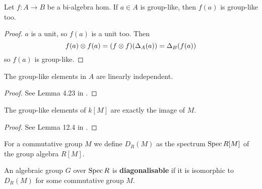 \begin{lemma}
  \label{0-grp-like-map}
  \leanok

  Let $f : A \to B$ be a bi-algebra hom. If $a \in A$ is group-like, then $f(a)$ is group-like too.
\end{lemma}
\begin{proof}
  \uses{}
  \leanok

  $a$ is a unit, so $f(a)$ is a unit too. Then
  \[
    f(a) \otimes f(a) = (f \otimes f)(\Delta_A(a)) = \Delta_B(f(a))
  \]
  so $f(a)$ is group-like.
\end{proof}


\begin{lemma}
  \label{0-grp-like-lin-indep}
  \leanok

  The group-like elements in $A$ are linearly independent.
\end{lemma}
\begin{proof}
  \leanok

  See Lemma 4.23 in \cite{Milne_2017}.
\end{proof}


\begin{lemma}
  \label{0-grp-like-grp-alg}
  \leanok

  The group-like elements of $k[M]$ are exactly the image of $M$.
\end{lemma}
\begin{proof}
  \leanok

  See Lemma 12.4 in \cite{Milne_2017}.
\end{proof}


\begin{definition}
  \label{0-spec-grp-alg}
  \leanok

  For a commutative group $M$ we define $D_R(M)$ as the spectrum $\operatorname{Spec} R[M]$ of the group algebra $R[M]$.
\end{definition}


\begin{definition}
  \label{0-diag}

  An algebraic group $G$ over $\operatorname{Spec} R$ is {\bf diagonalisable}
  if it is isomorphic to $D_R(M)$ for some commutative group $M$.
\end{definition}


